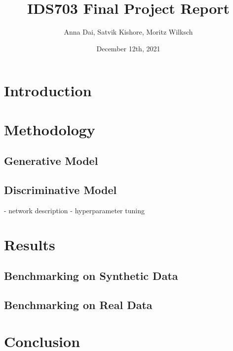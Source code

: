 \documentclass[11pt]{article}
\title{IDS703 Final Project Report}
\author{Anna Dai, Satvik Kishore, Moritz Wilksch}
\date{December 12th, 2021}
\begin{document}
\maketitle

\section{Introduction}

\section{Methodology}

\subsection{Generative Model}


\subsection{Discriminative Model}
- network description
- hyperparameter tuning

\section{Results}
\subsection{Benchmarking on Synthetic Data}


\subsection{Benchmarking on Real Data}

\section{Conclusion}
\end{document}
